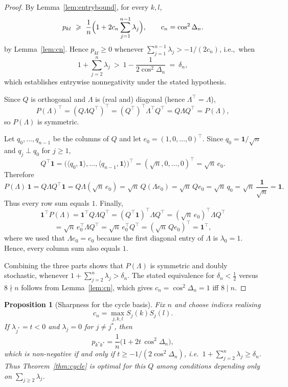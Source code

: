 \documentclass[12pt,fleqn]{amsart}
\renewcommand{\ge}{\geqslant}
\newtheorem{prop}[thm]{Proposition}
\theoremstyle{definition}
\theoremstyle{remark}
\newcommand{\1}{\mathbf{1}}
\begin{document}
\begin{proof}
By Lemma~\ref{lem:entrybound}, for every $k,l$,
\[
p_{kl}\ \ge\ \frac1n\Bigl(1+2c_n\sum_{j=1}^{n-1}\lambda_j\Bigr),
\qquad c_n=\cos^2\Delta_n.
\]
by Lemma~\ref{lem:cn}. Hence $p_{kl}\ge0$ whenever $\sum_{j=1}^{n-1}\lambda_j>-1/(2c_n)$, i.e.,\ when
\[
1+\sum_{j=2}^n\lambda_j\ >\ 1-\frac{1}{2\cos^2\Delta_n}\ =\ \delta_n,
\]
which establishes entrywise nonnegativity under the stated hypothesis.

\smallskip
Since $Q$ is orthogonal and $\Lambda$ is (real and) diagonal (hence $\Lambda^\top=\Lambda$),
\[
P(\Lambda)^\top=(Q\Lambda Q^\top)^\top=(Q^\top)^\top\Lambda^\top Q^\top=Q\Lambda Q^\top=P(\Lambda),
\]
so $P(\Lambda)$ is symmetric.

\smallskip
Let $q_0,\dots,q_{n-1}$ be the columns of $Q$ and let $e_0=(1,0,\dots,0)^\top$. Since $q_0=\1/\sqrt n$ and $q_j\perp q_0$ for $j\ge1$,
\[
Q^\top\1=\big(\langle q_0,\1\rangle,\dots,\langle q_{n-1},\1\rangle\big)^\top=(\sqrt n,0,\dots,0)^\top=\sqrt n\,e_0.
\]
Therefore
\[
P(\Lambda)\,\1
=Q\Lambda Q^\top\1
=Q\Lambda(\sqrt n\,e_0)
=\sqrt n\,Q(\Lambda e_0)
=\sqrt n\,Q e_0
=\sqrt n\,q_0
=\sqrt n\,\frac{\1}{\sqrt n}
=\1.
\]
Thus every row sum equals $1$. Finally,
\[
\1^\top P(\Lambda)
=\1^\top Q\Lambda Q^\top
=(Q^\top\1)^\top \Lambda Q^\top
=(\sqrt n\,e_0)^\top \Lambda Q^\top
\]
\[
=\sqrt n\,e_0^\top \Lambda Q^\top
=\sqrt n\,e_0^\top Q^\top
=(\sqrt n\,Q e_0)^\top
=\1^\top,
\]
where we used that $\Lambda e_0=e_0$ because the first diagonal entry of $\Lambda$ is $\lambda_0=1$. Hence, every column sum also equals $1$.

Combining the three parts shows that $P(\Lambda)$ is symmetric and doubly stochastic, whenever $1+\sum_{j=2}^n\lambda_j>\delta_n$. The stated equivalence for $\delta_n<\tfrac12$ versus $8\nmid n$ follows from Lemma~\ref{lem:cn}, which gives $c_n=\cos^2\Delta_n=1$ iff $8\mid n$.
\end{proof}


\begin{prop}[Sharpness for the cycle basis]\label{prop:sharp}
Fix $n$ and choose indices realising 
\[
    c_n=\max_{j,k,l}S_j(k)S_j(l).
\]
If $\lambda_{j^{\ast}}=t<0$ and $\lambda_j=0$ for $j\ne j^{\ast}$, then
\[
p_{k^{\ast}k^{\ast}}=\frac1n\bigl(1+2t\,\cos^2\Delta_n\bigr),
\]
which is non-negative if and only if $t\ge -1/(2\cos^2\Delta_n)$, i.e.\ $1+\sum_{j=2}^n\lambda_j\ge\delta_n$. Thus Theorem~\ref{thm:cycle} is optimal for this $Q$ among conditions depending only on $\sum_{j\ge 2}\lambda_j$.
\end{prop}
\end{document}
